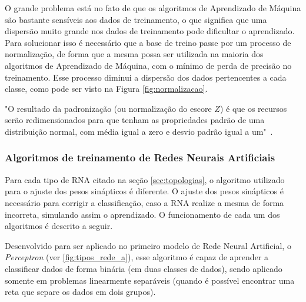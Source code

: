 \documentclass[12pt,oneside,a4paper,chapter=TITLE,section=TITLE,sumario
		=tradicional]{abntex2}
\begin{document}
		O grande problema está no fato de que os algoritmos de Aprendizado de Máquina são bastante sensíveis aos dados de treinamento, o que significa que uma dispersão muito grande nos dados de treinamento pode dificultar o aprendizado. Para solucionar isso é necessário que a base de treino passe por um processo de normalização, de forma que a mesma possa ser utilizada na maioria dos algoritmos de Aprendizado de Máquina, com o mínimo de perda de precisão no treinamento. Esse processo diminui a dispersão dos dados pertencentes a cada classe, como pode ser visto na Figura \ref{fig:normalizacao}.
		
		\begin{citacao}
		"O resultado da padronização (ou normalização do escore $Z$) é que os recursos serão redimensionados para que tenham as propriedades padrão de uma distribuição normal, com média igual a zero e desvio padrão igual a um"~\cite{sebastian_normalization}.
		\end{citacao}		
		
		\begin{figure}[h]
		\end{figure}
			
		\subsubsection{Algoritmos de treinamento de Redes Neurais Artificiais}

		Para cada tipo de RNA citado na seção \ref{sec:topologias}, o algoritmo utilizado para o ajuste dos pesos sinápticos é diferente. O ajuste dos pesos sinápticos é necessário para corrigir a classificação, caso a RNA realize a mesma de forma incorreta, simulando assim o aprendizado. O funcionamento de cada um dos algoritmos é descrito a seguir.
		
		\label{sec:alg_lms}
		
		Desenvolvido para ser aplicado no primeiro modelo de Rede Neural Artificial, o \textit{Perceptron} (ver \autoref{fig:tipos_rede_a}), esse algoritmo é capaz de aprender a classificar dados de forma binária (em duas classes de dados), sendo aplicado somente em problemas linearmente separáveis (quando é possível encontrar uma reta que separe os dados em dois grupos). 
				
\end{document}
